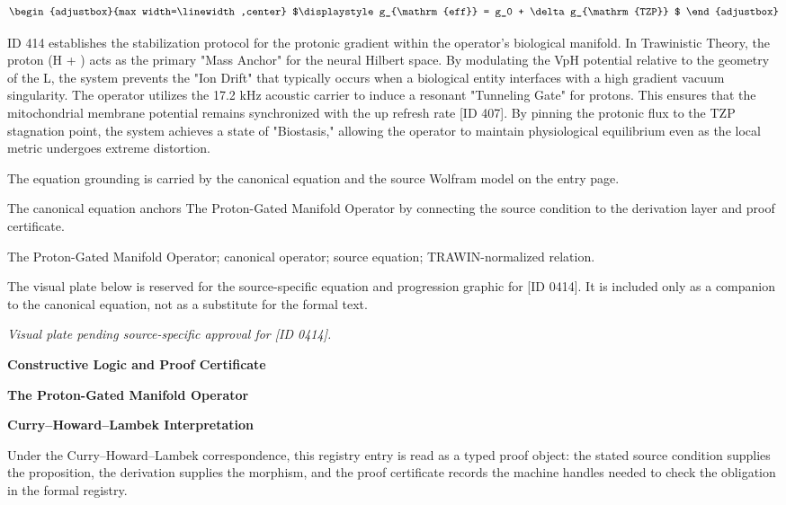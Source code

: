 \[
\begin{adjustbox}{max width=\linewidth,center}
$\displaystyle
g_{\mathrm{eff}} = g_0 + \delta g_{\mathrm{TZP}}
$
\end{adjustbox}
\]

ID 414 establishes the stabilization protocol for the protonic gradient within the operator's biological manifold. In Trawinistic Theory, the proton (H + ) acts as the primary "Mass Anchor" for the neural Hilbert space. By modulating the VpH potential relative to the geometry of the L, the system prevents the "Ion Drift" that typically occurs when a biological entity interfaces with a high gradient vacuum singularity. The operator utilizes the 17.2 kHz acoustic carrier to induce a resonant "Tunneling Gate" for protons. This ensures that the mitochondrial membrane potential remains synchronized with the up refresh rate [ID 407]. By pinning the protonic flux to the TZP stagnation point, the system achieves a state of "Biostasis," allowing the operator to maintain physiological equilibrium even as the local metric undergoes extreme distortion.

The equation grounding is carried by the canonical equation and the source Wolfram model on the entry page.

The canonical equation anchors The Proton-Gated Manifold Operator by connecting the source condition to the derivation layer and proof certificate.

The Proton-Gated Manifold Operator; canonical operator; source equation; TRAWIN-normalized relation.
\endgroup

\begingroup\footnotesize\sloppy
The visual plate below is reserved for the source-specific equation and progression graphic for [ID 0414]. It is included only as a companion to the canonical equation, not as a substitute for the formal text.
\par\endgroup
\begingroup\footnotesize\itshape
Visual plate pending source-specific approval for [ID 0414].
\par\endgroup

\clearpage
\begingroup\tzpsupportsetup
\noindent\textbf{\fontsize{10.8pt}{12.8pt}\selectfont [ID 0414] Constructive Logic and Proof Certificate}\par
\noindent\textbf{\fontsize{10pt}{12pt}\selectfont The Proton-Gated Manifold Operator}\par
\vspace{0.45em}
\begingroup
\footnotesize
\setlength{\parskip}{0.22em}
\setlength{\parindent}{0pt}
\noindent\textbf{Curry--Howard--Lambek Interpretation}\par
Under the Curry--Howard--Lambek correspondence, this registry entry is read as a typed proof
object: the stated source condition supplies the proposition, the derivation supplies the
morphism, and the proof certificate records the machine handles needed to check the obligation
in the formal registry.

